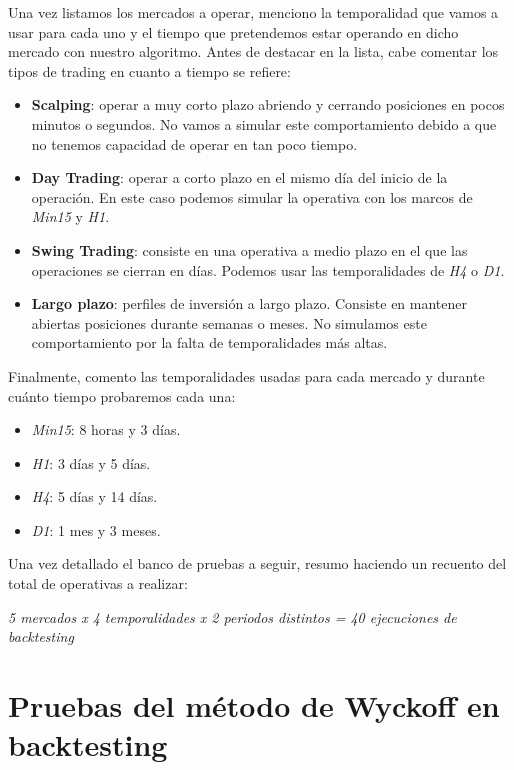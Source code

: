 Una vez listamos los mercados a operar, menciono la temporalidad que vamos a usar para cada uno y el tiempo que pretendemos estar operando en dicho mercado con nuestro algoritmo. Antes de destacar en la lista, cabe comentar los tipos de trading en cuanto a tiempo se refiere:\newline

\begin{itemize}
	\item \textbf{Scalping}: operar a muy corto plazo abriendo y cerrando posiciones en pocos minutos o segundos. No vamos a simular este comportamiento debido a que no tenemos capacidad de operar en tan poco tiempo.
	\item \textbf{Day Trading}: operar a corto plazo en el mismo día del inicio de la operación. En este caso podemos simular la operativa con los marcos de \textit{Min15} y \textit{H1}.
	\item \textbf{Swing Trading}: consiste en una operativa a medio plazo en el que las operaciones se cierran en días. Podemos usar las temporalidades de \textit{H4} o \textit{D1}.
	\item \textbf{Largo plazo}: perfiles de inversión a largo plazo. Consiste en mantener abiertas posiciones durante semanas o meses. No simulamos este comportamiento por la falta de temporalidades más altas.
\end{itemize}

Finalmente, comento las temporalidades usadas para cada mercado y durante cuánto tiempo probaremos cada una:\newline

\begin{itemize}
	\item \textit{Min15}: 8 horas y 3 días.
	\item \textit{H1}: 3 días y 5 días.
	\item \textit{H4}: 5 días y 14 días.
	\item \textit{D1}: 1 mes y 3 meses.
\end{itemize}

Una vez detallado el banco de pruebas a seguir, resumo haciendo un recuento del total de operativas a realizar:\newline

\textit{5 mercados x 4 temporalidades x 2 periodos distintos = 40 ejecuciones de backtesting} \newline

\section{Pruebas del método de Wyckoff en backtesting}

